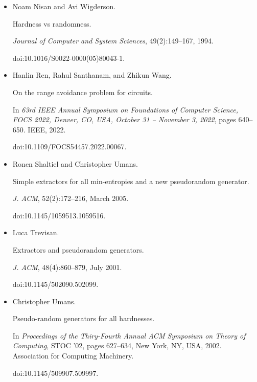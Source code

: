 \begin{itemize}
\emph{Journal of Computer and System Sciences}, 49(3):478–516, 1994.


30th IEEE Conference on Foundations of Computer Science.


doi:10.1016/S0022-0000(05)80069-8.





\item[] 
[26]

Noam Nisan and Avi Wigderson.


Hardness vs randomness.


\emph{Journal of Computer and System Sciences}, 49(2):149–167, 1994.


doi:10.1016/S0022-0000(05)80043-1.





\item[] 
[27]

Hanlin Ren, Rahul Santhanam, and Zhikun Wang.


On the range avoidance problem for circuits.


In \emph{63rd IEEE Annual Symposium on Foundations of Computer
Science, FOCS 2022, Denver, CO, USA, October 31 – November 3, 2022}, pages
640–650. IEEE, 2022.


doi:10.1109/FOCS54457.2022.00067.





\item[] 
[28]

Ronen Shaltiel and Christopher Umans.


Simple extractors for all min-entropies and a new pseudorandom
generator.


\emph{J. ACM}, 52(2):172–216, March 2005.


doi:10.1145/1059513.1059516.





\item[] 
[29]

Luca Trevisan.


Extractors and pseudorandom generators.


\emph{J. ACM}, 48(4):860–879, July 2001.


doi:10.1145/502090.502099.





\item[] 
[30]

Christopher Umans.


Pseudo-random generators for all hardnesses.


In \emph{Proceedings of the Thiry-Fourth Annual ACM Symposium on
Theory of Computing}, STOC ’02, pages 627–634, New York, NY, USA, 2002.
Association for Computing Machinery.


doi:10.1145/509907.509997.





\end{itemize}




